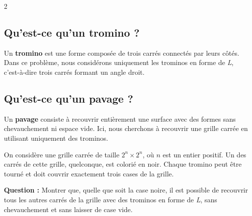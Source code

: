 \begin{problem}
    \begin{multicols}{2}
        \subsection*{Qu'est-ce qu'un tromino ?}
            Un \textbf{tromino} est une forme compos\'ee de trois carr\'es connect\'es par leurs c\^ot\'es.
            Dans ce probl\`eme, nous consid\'erons uniquement les trominos en forme de \textit{L}, c'est-\`a-dire trois carr\'es formant un angle droit.

        \vspace{1\baselineskip}
        \subsection*{Qu'est-ce qu'un pavage ?}
            Un \textbf{pavage} consiste \`a recouvrir enti\`erement une surface avec des formes sans chevauchement ni espace vide.
            Ici, nous cherchons \`a recouvrir une grille carr\'ee en utilisant uniquement des trominos.

        \columnbreak

        \noindent{}
    \end{multicols}

        \vspace{2\baselineskip}
        On consid\`ere une grille carr\'ee de taille $2^n \times 2^n$, o\`u $n$ est un entier positif. Un des carr\'es de cette grille, quelconque, est colori\'e en noir. Chaque tromino peut \^etre tourn\'e et doit couvrir exactement trois cases de la grille.

        \textbf{Question :} Montrer que, quelle que soit la case noire, il est possible de recouvrir tous les autres carr\'es de la grille avec des trominos en forme de \textit{L}, sans chevauchement et sans laisser de case vide.
\end{problem}
